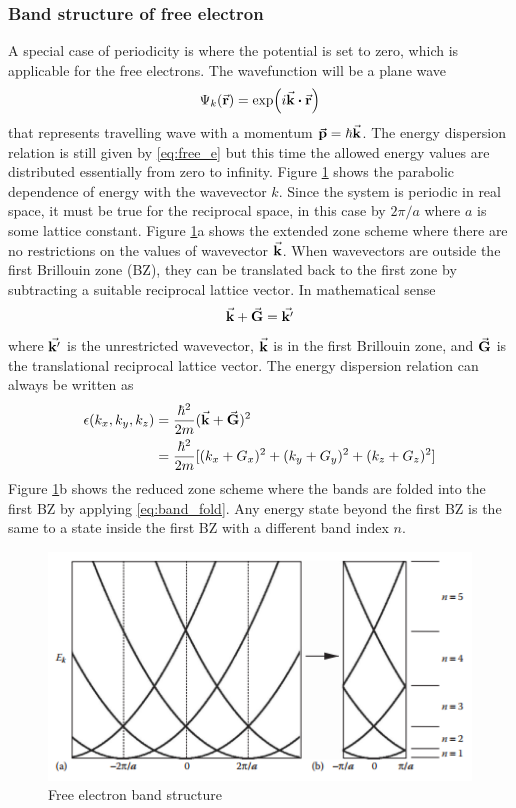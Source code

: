 \subsubsection{Band structure of free electron}
A special case of periodicity is where the potential is set to zero, which is applicable for the free electrons. The wavefunction will be a plane wave
\begin{equation}
	\Psi_k(\va{r})  = \exp(i \va{k} \vdot \va{r})
\end{equation}
that represents travelling wave with a momentum $\va{p} = \hbar \va{k}$. The energy dispersion relation is still given by \eqref{eq:free_e} but this time the allowed energy values are distributed essentially from zero to infinity. Figure \ref{fig:free-electron} shows the parabolic dependence of energy with the wavevector $k$. Since the system is periodic in real space, it must be true for the reciprocal space, in this case by $2\pi/a$ where $a$ is some lattice constant. Figure \ref{fig:free-electron}a shows the extended zone scheme where there are no restrictions on the values of wavevector $\va{k}$. When wavevectors are outside the first Brillouin zone (BZ), they can be translated back to the first zone by subtracting a suitable reciprocal lattice vector. In mathematical sense \citep{Kittel2004}
\begin{equation} \label{eq:band_fold}
	\va{k} + \va{G} = \va{k'}
\end{equation}
where $\va{k'}$ is the unrestricted wavevector, $\va{k}$ is in the first Brillouin zone, and $\va{G}$ is the translational reciprocal lattice vector. The energy dispersion relation can always be written as
\begin{align}
	\epsilon(k_x,k_y,k_z) & = \frac{\hbar^2}{2m} (\va{k}+\va{G})^2 \notag                       \\
	                      & = \frac{\hbar^2}{2m}[(k_x + G_x)^2 + (k_y + G_y)^2 + (k_z + G_z)^2]
\end{align}
Figure \ref{fig:free-electron}b shows the reduced zone scheme where the  bands are folded into the first BZ by applying \eqref{eq:band_fold}. Any energy state beyond the first BZ is the same to a state inside the first BZ with a different band index $n$.

\begin{figure}[tbh!]
	\centering
	\includegraphics[width=0.7\linewidth]{"images/free electron"}
	\caption[Free electron band structure]{Free electron band structure}
	\label{fig:free-electron}
\end{figure}

